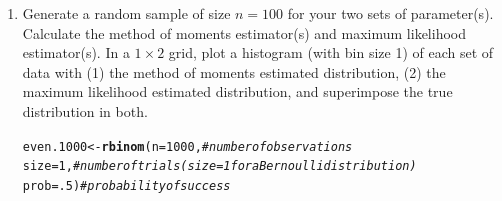 \documentclass{article}\usepackage[]{graphicx}\usepackage[]{color}
\makeatletter
\newcommand{\hlnum}[1]{\textcolor[rgb]{0.686,0.059,0.569}{#1}}%
\newcommand{\hlcom}[1]{\textcolor[rgb]{0.678,0.584,0.686}{\textit{#1}}}%
\newcommand{\hlstd}[1]{\textcolor[rgb]{0.345,0.345,0.345}{#1}}%
\newcommand{\hlkwb}[1]{\textcolor[rgb]{0.69,0.353,0.396}{#1}}%
\newcommand{\hlkwc}[1]{\textcolor[rgb]{0.333,0.667,0.333}{#1}}%
\newcommand{\hlkwd}[1]{\textcolor[rgb]{0.737,0.353,0.396}{\textbf{#1}}}%
\newenvironment{kframe}{%
 \def\at@end@of@kframe{}%
 \ifinner\ifhmode%
  \def\at@end@of@kframe{\end{minipage}}%
  \begin{minipage}{\columnwidth}%
 \fi\fi%
 \def\FrameCommand##1{\hskip\@totalleftmargin \hskip-\fboxsep
 \colorbox{shadecolor}{##1}\hskip-\fboxsep
     \hskip-\linewidth \hskip-\@totalleftmargin \hskip\columnwidth}%
 \MakeFramed {\advance\hsize-\width
   \@totalleftmargin\z@ \linewidth\hsize
   \@setminipage}}%
 {\par\unskip\endMakeFramed%
 \at@end@of@kframe}
\newenvironment{knitrout}{}{} %
\makeatother
\begin{document}
\begin{enumerate}
\begin{enumerate}
\begin{knitrout}
\end{knitrout}
  \item Generate a random sample of size $n=100$ for your two sets of parameter(s).
  Calculate the method of moments estimator(s) and maximum likelihood estimator(s).
  In a $1 \times 2$ grid, plot a histogram (with bin size 1) of each set of data 
  with (1) the method of moments estimated distribution, (2) the maximum likelihood
  estimated distribution, and superimpose the true distribution in both.
\begin{knitrout}
\color{fgcolor}\begin{kframe}
\begin{alltt}
\hlstd{even.1000} \hlkwb{<-} \hlkwd{rbinom}\hlstd{(}\hlkwc{n}\hlstd{=}\hlnum{1000}\hlstd{,}        \hlcom{#number of observations}
                  \hlkwc{size}\hlstd{=}\hlnum{1}\hlstd{,}        \hlcom{#number of trials (size=1 for a Bernoulli distribution)}
                  \hlkwc{prob}\hlstd{=}\hlnum{.5}\hlstd{)}       \hlcom{#probability of success}


\end{alltt}
\end{kframe}
\end{knitrout}
\end{enumerate}
\end{enumerate}
\end{document}
